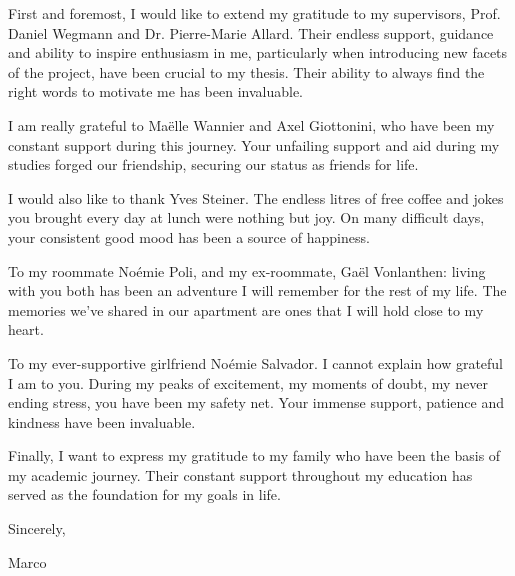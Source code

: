 \documentclass[
11pt, %
oneside, %
english, %
singlespacing, %
headsepline, %
chapterinoneline, %
]{MastersDoctoralThesis} %
\begin{document}
\begin{acknowledgements}\label{sec:acknowledgements}
\addchaptertocentry{\acknowledgementname} %
First and foremost, I would like to extend my gratitude to my supervisors, Prof. Daniel Wegmann and Dr. Pierre-Marie Allard. Their endless support, guidance and ability to inspire enthusiasm in me, particularly when introducing new facets of the project, have been crucial to my thesis. Their ability to always find the right words to motivate me has been invaluable.

I am really grateful to Maëlle Wannier and Axel Giottonini, who have been my constant support during this journey. Your unfailing support and aid during my studies forged our friendship, securing our status as friends for life. 

I would also like to thank Yves Steiner. The endless litres of free coffee and jokes you brought every day at lunch were nothing but joy. On many difficult days, your consistent good mood has been a source of happiness. 

To my roommate Noémie Poli, and my ex-roommate, Gaël Vonlanthen: living with you both has been an adventure I will remember for the rest of my life. The memories we've shared in our apartment are ones that I will hold close to my heart. 

To my ever-supportive girlfriend Noémie Salvador. I cannot explain how grateful I am to you. During my peaks of excitement, my moments of doubt, my never ending stress, you have been my safety net. Your immense support, patience and kindness have been invaluable. 

Finally, I want to express my gratitude to my family who have been the basis of my academic journey. Their constant support throughout my education has served as the foundation for my goals in life.

\begin{flushleft}
	Sincerely, 

Marco
\end{flushleft}
\end{acknowledgements}


\tableofcontents %

\end{document}
